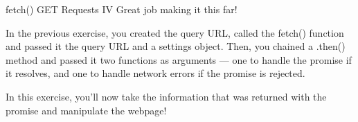 fetch() GET Requests IV
    Great job making it this far!

    In the previous exercise, you created the query URL, called the fetch() function and passed it the query URL and a settings object. Then, you chained a .then() method and passed it two functions as arguments — one to handle the promise if it resolves, and one to handle network errors if the promise is rejected.

    In this exercise, you’ll now take the information that was returned with the promise and manipulate the webpage!